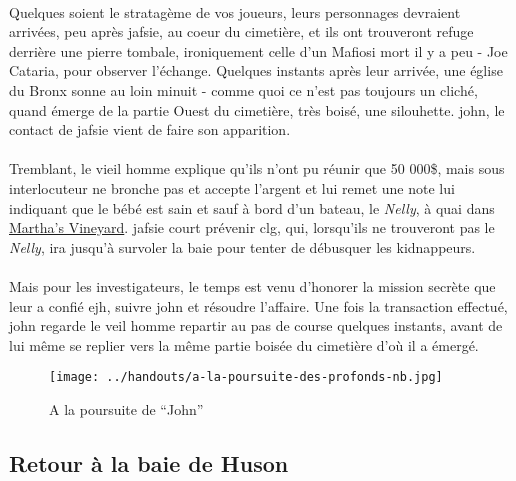 \paragraph{} Quelques soient le stratagème de vos joueurs, leurs personnages devraient arrivées, peu après \gls{jafsie}, au coeur 
du cimetière, et ils ont trouveront refuge derrière une pierre tombale, ironiquement celle d'un Mafiosi mort il y a peu - Joe Cataria, 
pour observer l'échange. Quelques instants après leur arrivée, une église du Bronx sonne au loin minuit - comme quoi ce n'est pas toujours
un cliché, quand émerge de la partie Ouest du cimetière, très boisé, une silouhette. \gls{john}, le contact de \gls{jafsie} vient de 
faire son apparition.

\paragraph{} Tremblant, le vieil homme explique qu'ils n'ont pu réunir que 50 000\$, mais sous interlocuteur ne bronche pas et accepte 
l'argent et lui remet une note lui indiquant que le bébé est sain et sauf à bord d'un bateau, le \emph{Nelly}, à quai dans 
\href{http://en.wikipedia.org/wiki/Martha\%27s\_Vineyard}{Martha's Vineyard}. \gls{jafsie} court prévenir \gls{clg}, qui, lorsqu'ils ne 
trouveront pas le \emph{Nelly}, ira jusqu'à survoler la baie pour tenter de débusquer les kidnappeurs.

\paragraph{} Mais pour les investigateurs, le temps est venu d'honorer la mission secrète que leur a confié \gls{ejh}, suivre \gls{john} et
résoudre l'affaire. Une fois la transaction effectué, \gls{john} regarde le veil homme repartir au pas de course quelques instants, avant 
de lui même se replier vers la même partie boisée du cimetière d'où il a émergé.

\begin{figure}[h]
 \begin{center}
  \texttt{[image: ../handouts/a-la-poursuite-des-profonds-nb.jpg]}
  \end{center}
\caption{A la poursuite de ``John''}
\end{figure}


\subsection{Retour à la baie de Huson}

